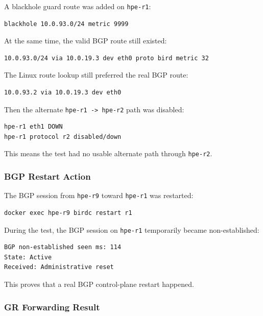 A blackhole guard route was added on \texttt{hpe-r1}:

\begin{verbatim}
blackhole 10.0.93.0/24 metric 9999
\end{verbatim}

At the same time, the valid BGP route still existed:

\begin{verbatim}
10.0.93.0/24 via 10.0.19.3 dev eth0 proto bird metric 32
\end{verbatim}

The Linux route lookup still preferred the real BGP route:

\begin{verbatim}
10.0.93.2 via 10.0.19.3 dev eth0
\end{verbatim}

Then the alternate \texttt{hpe-r1 -> hpe-r2} path was disabled:

\begin{verbatim}
hpe-r1 eth1 DOWN
hpe-r1 protocol r2 disabled/down
\end{verbatim}

This means the test had no usable alternate path through \texttt{hpe-r2}.

\subsubsection{BGP Restart Action}

The BGP session from \texttt{hpe-r9} toward \texttt{hpe-r1} was restarted:

\begin{verbatim}
docker exec hpe-r9 birdc restart r1
\end{verbatim}

During the test, the BGP session on \texttt{hpe-r1} temporarily became non-established:

\begin{verbatim}
BGP non-established seen ms: 114
State: Active
Received: Administrative reset
\end{verbatim}

This proves that a real BGP control-plane restart happened.

\subsubsection{GR Forwarding Result}


